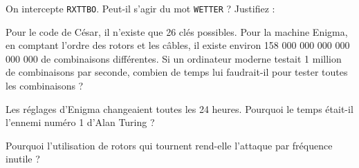 \begin{Exercise}[title={Le défi de la machine Enigma et le génie de Bletchley Park}]
\Question On intercepte \texttt{RXTTBO}. Peut-il s'agir du mot \texttt{WETTER} ? Justifiez : \dotfill\\
\dotfill

\Question Pour le code de César, il n'existe que 26 clés possibles. Pour la machine Enigma, en comptant l'ordre des rotors et les câbles, il existe environ 158 000 000 000 000 000 000 de combinaisons différentes. Si un ordinateur moderne testait 1 million de combinaisons par seconde, combien de temps lui faudrait-il pour tester toutes les combinaisons ?\\
\emptybox{2cm}

\Question Les réglages d'Enigma changeaient toutes les 24 heures. Pourquoi le temps était-il l'ennemi numéro 1 d'Alan Turing ?\\
\emptybox{2cm}

\Question Pourquoi l'utilisation de rotors qui tournent rend-elle l'attaque par fréquence inutile ? \\
\emptybox{5cm}
\end{Exercise}
